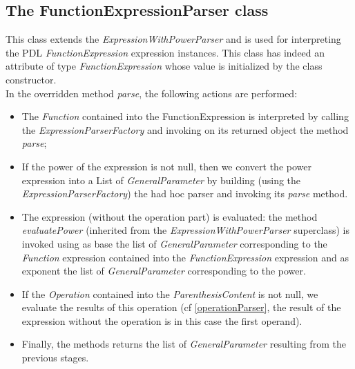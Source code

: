\documentclass[a4paper,11pt] {ivoa}
\begin{document}
\subsection{The FunctionExpressionParser class}
This class extends the {\it ExpressionWithPowerParser} and is used for interpreting the PDL {\it  FunctionExpression} expression instances. This class has indeed an attribute of type {\it FunctionExpression} whose value is initialized by the class constructor.\\
In the overridden method {\it parse}, the following actions are performed:
\begin{itemize}
\item The {\it Function} contained into the FunctionExpression is interpreted by calling the {\it ExpressionParserFactory} and invoking on its returned object the method {\it parse};
\item  If the power of the expression is not null, then we convert the power expression into a List of {\it GeneralParameter} by building (using the {\it ExpressionParserFactory}) the had hoc parser and invoking its {\it parse} method.
\item The expression (without the operation part) is evaluated:  the method {\it evaluatePower} (inherited from the {\it ExpressionWithPowerParser} superclass) is invoked using as base the list of {\it GeneralParameter} corresponding to the {\it Function} expression contained into the {\it FunctionExpression} expression  and as exponent the list of {\it GeneralParameter} corresponding to the power.
\item  If the {\it Operation} contained into the {\it ParenthesisContent}  is not null, we evaluate the results of this operation (cf \ref{operationParser}, the result of the expression without the operation is in this case the first operand).
\item Finally, the methods returns the list of {\it GeneralParameter} resulting from the previous stages.
\end{itemize}
\end{document}
